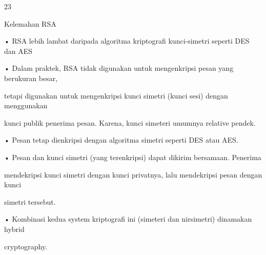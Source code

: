 \documentclass{article}
\begin{document}

23

Kelemahan RSA

• RSA lebih lambat daripada algoritma kriptografi kunci-simetri seperti DES dan AES 

• Dalam praktek, RSA tidak digunakan untuk mengenkripsi pesan yang berukuran besar, 

tetapi digunakan untuk mengenkripsi kunci simetri (kunci sesi) dengan menggunakan 

kunci publik penerima pesan. Karena, kunci simeteri umumnya relative pendek.

• Pesan tetap dienkripsi dengan algoritma simetri seperti DES atau AES.

• Pesan  dan kunci simetri (yang terenkripsi) dapat dikirim bersamaan. Penerima 

mendekripsi kunci simetri dengan kunci privatnya, lalu mendekripsi pesan dengan kunci 

simetri tersebut.

• Kombinasi kedua system kriptografi ini (simeteri dan nirsimetri) dinamakan hybrid 

cryptography.
\end{document}
